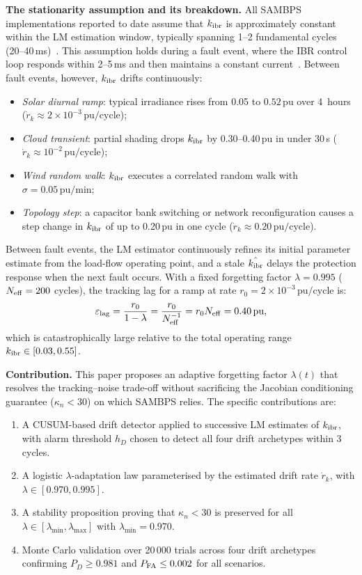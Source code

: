 \documentclass[journal]{IEEEtran}
\newcommand{\kibr}{k_{\rm ibr}}
\newcommand{\lambdamax}{\lambda_{\max}}
\newcommand{\lambdamin}{\lambda_{\min}}
\newcommand{\Neff}{N_{\rm eff}}
\newcommand{\kappan}{\kappa_n}
\newcommand{\rdot}{\dot{r}_k}
\begin{document}
\textbf{The stationarity assumption and its breakdown.}
All SAMBPS implementations reported to date assume that $\kibr$ is
approximately constant within the LM estimation window, typically
spanning 1--2 fundamental cycles (20--40\,ms)~\cite{SAMBP_TR65}.
This assumption holds during a fault event, where the IBR control
loop responds within 2--5\,ms and then maintains a constant
current~\cite{Vittal2019}.  Between fault events, however, $\kibr$
drifts continuously:
\begin{itemize}
  \item \emph{Solar diurnal ramp}: typical irradiance rises from
        0.05 to $0.52\,\text{pu}$ over 4~hours ($\rdot \approx
        2\times10^{-3}\,\text{pu/cycle}$);
  \item \emph{Cloud transient}: partial shading drops $\kibr$ by
        0.30--0.40\,pu in under 30\,s ($\rdot \approx
        10^{-2}\,\text{pu/cycle}$);
  \item \emph{Wind random walk}: $\kibr$ executes a correlated
        random walk with $\sigma = 0.05\,\text{pu/min}$;
  \item \emph{Topology step}: a capacitor bank switching or network
        reconfiguration causes a step change in $\kibr$ of up to
        0.20\,pu in one cycle ($\rdot \approx 0.20\,\text{pu/cycle}$).
\end{itemize}
Between fault events, the LM estimator continuously refines its
initial parameter estimate from the load-flow operating point, and a
stale $\hat{\kibr}$ delays the protection response when the next
fault occurs.  With a fixed forgetting factor $\lambda = 0.995$
($\Neff = 200$ cycles), the tracking lag for a ramp at rate
$r_0 = 2\times10^{-3}\,\text{pu/cycle}$ is:
\begin{equation}
  \varepsilon_{\rm lag} = \frac{r_0}{1 - \lambda} = \frac{r_0}{\Neff^{-1}}
  = r_0 \Neff = 0.40\,\text{pu},
  \label{eq:lag}
\end{equation}
which is catastrophically large relative to the total operating
range $\kibr \in [0.03, 0.55]$.

\textbf{Contribution.}
This paper proposes an adaptive forgetting factor $\lambda(t)$ that
resolves the tracking--noise trade-off without sacrificing the
Jacobian conditioning guarantee ($\kappan < 30$) on which SAMBPS
relies.  The specific contributions are:
\begin{enumerate}[(C1)]
  \item A CUSUM-based drift detector applied to successive LM
        estimates of $\kibr$, with alarm threshold $h_D$ chosen to
        detect all four drift archetypes within 3 cycles.
  \item A logistic $\lambda$-adaptation law parameterised by the
        estimated drift rate $\rdot$, with $\lambda \in
        [0.970, 0.995]$.
  \item A stability proposition proving that $\kappan < 30$ is
        preserved for all $\lambda \in [\lambdamin, \lambdamax]$
        with $\lambdamin = 0.970$.
  \item Monte Carlo validation over 20\,000 trials across four
        drift archetypes confirming $P_D \geq 0.981$ and
        $P_{\rm FA} \leq 0.002$ for all scenarios.
\end{enumerate}
\end{document}
